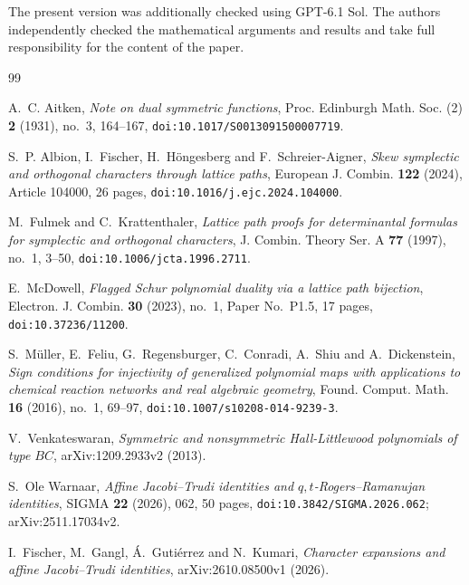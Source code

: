 \documentclass[12pt]{article}
\numberwithin{equation}{section}
\begin{document}
The present version was additionally checked using GPT-6.1 Sol.
The authors independently checked the mathematical arguments and
results and take full responsibility for the content of the paper.
\medskip
\begin{thebibliography}{99}
\raggedright

A.~C. Aitken,
\emph{Note on dual symmetric functions},
Proc. Edinburgh Math. Soc. (2) \textbf{2} (1931), no.~3, 164--167,
\texttt{doi:10.1017/S0013091500007719}.

S.~P. Albion, I.~Fischer, H.~H\"ongesberg and F.~Schreier-Aigner,
\emph{Skew symplectic and orthogonal characters through lattice paths},
European J. Combin. \textbf{122} (2024), Article 104000, 26 pages,
\texttt{doi:10.1016/j.ejc.2024.104000}.

M.~Fulmek and C.~Krattenthaler,
\emph{Lattice path proofs for determinantal formulas for symplectic and
orthogonal characters},
J. Combin. Theory Ser. A \textbf{77} (1997), no.~1, 3--50,
\texttt{doi:10.1006/jcta.1996.2711}.

E.~McDowell,
\emph{Flagged Schur polynomial duality via a lattice path bijection},
Electron. J. Combin. \textbf{30} (2023), no.~1, Paper No.~P1.5, 17 pages,
\texttt{doi:10.37236/11200}.

S.~M\"uller, E.~Feliu, G.~Regensburger, C.~Conradi, A.~Shiu and
A.~Dickenstein,
\emph{Sign conditions for injectivity of generalized polynomial maps with
applications to chemical reaction networks and real algebraic geometry},
Found. Comput. Math. \textbf{16} (2016), no.~1, 69--97,
\texttt{doi:10.1007/s10208-014-9239-3}.

V.~Venkateswaran,
\emph{Symmetric and nonsymmetric Hall-Littlewood polynomials of type
$BC$},
arXiv:1209.2933v2 (2013).

S.~Ole Warnaar,
\emph{Affine Jacobi--Trudi identities and $q,t$-Rogers--Ramanujan identities},
SIGMA \textbf{22} (2026), 062, 50 pages,
\texttt{doi:10.3842/SIGMA.2026.062}; arXiv:2511.17034v2.

I.~Fischer, M.~Gangl, \'A.~Guti\'errez and N.~Kumari,
\emph{Character expansions and affine Jacobi--Trudi identities},
arXiv:2610.08500v1 (2026).


\end{thebibliography}
\end{document}

